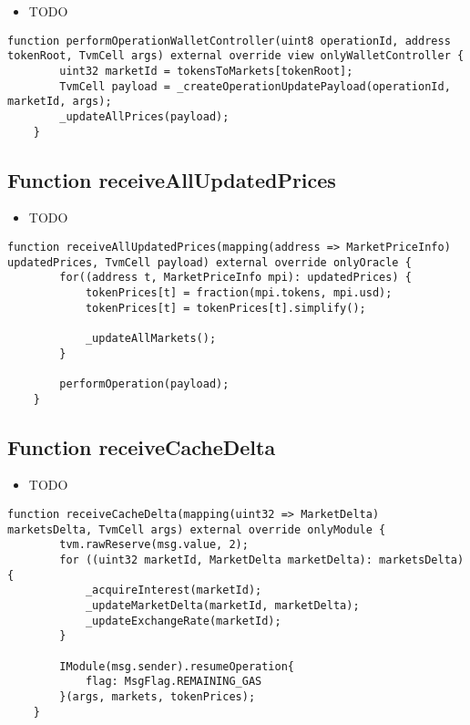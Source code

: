 \noindent\begin{itemize}
\item TODO
\end{itemize}

\begin{lstlisting}[firstnumber=350]
    function performOperationWalletController(uint8 operationId, address tokenRoot, TvmCell args) external override view onlyWalletController {
        uint32 marketId = tokensToMarkets[tokenRoot];
        TvmCell payload = _createOperationUpdatePayload(operationId, marketId, args);
        _updateAllPrices(payload);
    }
\end{lstlisting}

\subsection{Function receiveAllUpdatedPrices}

\noindent\begin{itemize}
\item TODO
\end{itemize}

\begin{lstlisting}[firstnumber=457]
    function receiveAllUpdatedPrices(mapping(address => MarketPriceInfo) updatedPrices, TvmCell payload) external override onlyOracle {
        for((address t, MarketPriceInfo mpi): updatedPrices) {
            tokenPrices[t] = fraction(mpi.tokens, mpi.usd);
            tokenPrices[t] = tokenPrices[t].simplify();

            _updateAllMarkets();
        }

        performOperation(payload);
    }
\end{lstlisting}

\subsection{Function receiveCacheDelta}

\noindent\begin{itemize}
\item TODO
\end{itemize}

\begin{lstlisting}[firstnumber=100]
    function receiveCacheDelta(mapping(uint32 => MarketDelta) marketsDelta, TvmCell args) external override onlyModule {
        tvm.rawReserve(msg.value, 2);
        for ((uint32 marketId, MarketDelta marketDelta): marketsDelta) {
            _acquireInterest(marketId);
            _updateMarketDelta(marketId, marketDelta);
            _updateExchangeRate(marketId);
        }

        IModule(msg.sender).resumeOperation{
            flag: MsgFlag.REMAINING_GAS
        }(args, markets, tokenPrices);
    }
\end{lstlisting}

